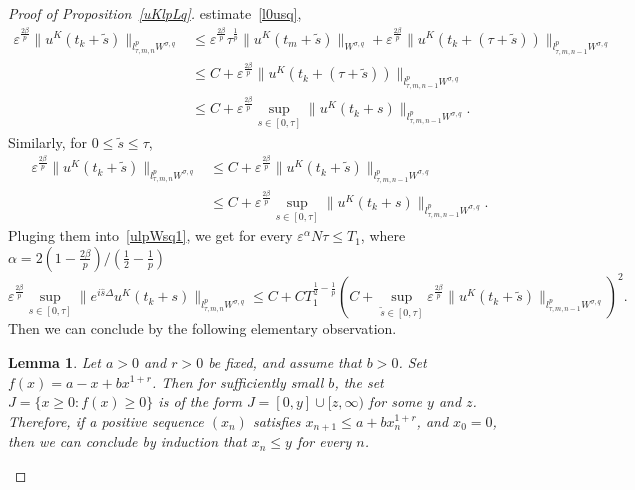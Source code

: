 \documentclass[10pt,a4paper]{article}
\newtheorem{lemma}[theorem]{Lemma}
\begin{document}
\begin{proof}[Proof of Proposition~\ref{uKlpLq}]
    estimate~\eqref{l0usq},
    \begin{equation*}
      \begin{aligned}
        \varepsilon^{\frac{2\beta}p} \|u^K(t_k+\tilde{s})\|_{l^p_{\tau,m,n}W^{\sigma,q}}
        &\leq \varepsilon^{\frac{2\beta}p} \tau^\frac1p \|u^K(t_m+\tilde{s})\|_{W^{\sigma,q}}
        + \varepsilon^{\frac{2\beta}p} \|u^K(t_k+(\tau+\tilde{s}))\|_{l^p_{\tau,m,n-1}W^{\sigma,q}} \\
        &\leq C + \varepsilon^{\frac{2\beta}p} \|u^K(t_k+(\tau+\tilde{s}))\|_{l^p_{\tau,m,n-1}W^{\sigma,q}} \\
        &\leq C + \varepsilon^{\frac{2\beta}p} \sup_{s \in [0,\tau]} \|u^K(t_k+s)\|_{l^p_{\tau,m,n-1}W^{\sigma,q}}.
      \end{aligned}
    \end{equation*}
    Similarly, for \( 0\leq\tilde{s}\leq \tau\), 
    \begin{equation*}
      \begin{aligned}
        \varepsilon^{\frac{2\beta}p} \|u^K(t_k+\tilde{s})\|_{l^p_{\tau,m,n}W^{\sigma,q}}
        &\leq C + \varepsilon^{\frac{2\beta}p} \|u^K(t_k+\tilde{s})\|_{l^p_{\tau,m,n-1}W^{\sigma,q}} \\
        &\leq C + \varepsilon^{\frac{2\beta}p} \sup_{s \in [0,\tau]} \|u^K(t_k+s)\|_{l^p_{\tau,m,n-1}W^{\sigma,q}}.
      \end{aligned}
    \end{equation*}
    Pluging them into~\eqref{ulpWsq1}, we get for every \(\varepsilon^\alpha N \tau \leq
    T_1 \), where \(\alpha = {2(1-\frac{2\beta}p)}/(\frac12-\frac1p)\)
    \begin{equation}\label{ulpWsq2}
      \varepsilon^{\frac{2\beta}p}\sup_{s\in[0,\tau]}\|e^{i\hat s\Delta}u^K(t_k+s)\|_{l^p_{\tau,m,n}W^{\sigma,q}} 
      \leq C + C T_1^{\frac12-\frac1p}
      \left(C + \sup_{\tilde{s} \in [0, \tau]} \varepsilon^{\frac{2\beta}p}
      \|u^K(t_k+\tilde{s})\|_{l^p_{\tau,m,n-1}W^{\sigma,q}}\right)^2.
    \end{equation}
    Then we can conclude by the following elementary observation. 

    \begin{lemma}\label{observation}
      Let \(a>0\) and \(r>0\) be fixed, and assume that \(b>0\). Set
      \(f(x)=a-x+bx^{1+r}\). Then for sufficiently small \(b\), the set 
      \(J = \{x\geq0:f(x)\geq0\}\) is of the form \(J=[0,y]\cup[z,\infty)\) for
      some \(y\) and \(z\). Therefore, if a positive sequence \((x_n)\) satisfies 
      \(x_{n+1} \leq a + b x_n^{1+r}\), and \(x_0=0\), then we can conclude by
      induction that \(x_n\leq y\) for every \(n\).
    \end{lemma}


\end{proof}
\end{document}
